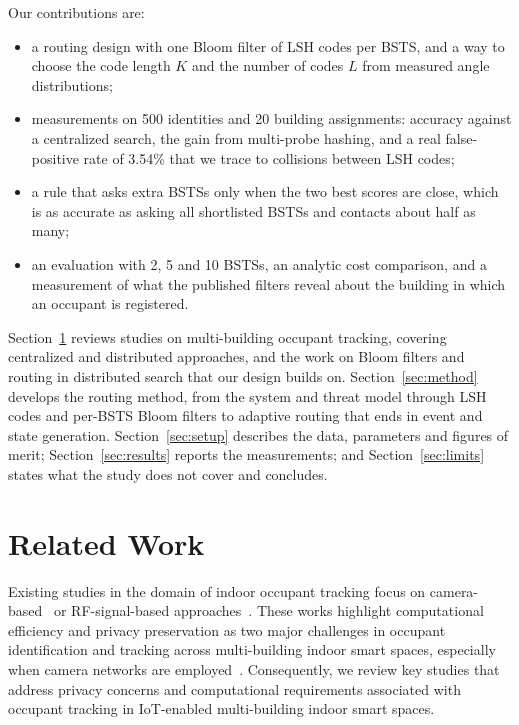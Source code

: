 \documentclass[pdflatex,sn-mathphys-num]{sn-jnl}%
\theoremstyle{thmstyleone}%
\theoremstyle{thmstyletwo}%
\theoremstyle{thmstylethree}%
\begin{document}
Our contributions are:
\begin{itemize}
\item a routing design with one Bloom filter of LSH codes per BSTS, and a way to choose the code length $K$ and the number of codes $L$ from measured angle distributions;
\item measurements on 500 identities and 20 building assignments: accuracy against a centralized search, the gain from multi-probe hashing, and a real false-positive rate of 3.54\% that we trace to collisions between LSH codes;
\item a rule that asks extra BSTSs only when the two best scores are close, which is as accurate as asking all shortlisted BSTSs and contacts about half as many;
\item an evaluation with 2, 5 and 10 BSTSs, an analytic cost comparison, and a measurement of what the published filters reveal about the building in which an occupant is registered.
\end{itemize}

Section~\ref{sec:related} reviews studies on multi-building occupant tracking, covering centralized and distributed approaches, and the work on Bloom filters and routing in distributed search that our design builds on. Section~\ref{sec:method} develops the routing method, from the system and threat model through LSH codes and per-BSTS Bloom filters to adaptive routing that ends in event and state generation. Section~\ref{sec:setup} describes the data, parameters and figures of merit; Section~\ref{sec:results} reports the measurements; and Section~\ref{sec:limits} states what the study does not cover and concludes.

\section{Related Work}
\label{sec:related}
Existing studies in the domain of indoor occupant tracking focus on camera-based~\cite{mohan2020} or RF-signal-based approaches~\cite{WZSYGWLLHSC2025}. These works highlight computational efficiency and privacy preservation as two major challenges in occupant identification and tracking across multi-building indoor smart spaces, especially when camera networks are employed~\cite{KKZWKMW2025}. Consequently, we review key studies that address privacy concerns and computational requirements associated with occupant tracking in IoT-enabled multi-building indoor smart spaces.
\end{document}
